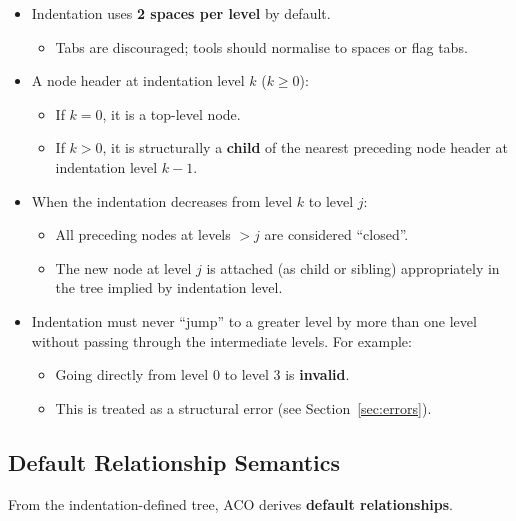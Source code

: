 \documentclass[11pt,twoside,a4paper]{article}
\begin{document}
\begin{itemize}[leftmargin=2em]
  \item Indentation uses \textbf{2 spaces per level} by default.
  \begin{itemize}[leftmargin=1.5em]
    \item Tabs are discouraged; tools should normalise to spaces or flag tabs.
  \end{itemize}

  \item A node header at indentation level \(k\) (\(k \geq 0\)):
  \begin{itemize}[leftmargin=1.5em]
    \item If \(k = 0\), it is a top-level node.
    \item If \(k > 0\), it is structurally a \textbf{child} of the nearest preceding node header at indentation level \(k - 1\).
  \end{itemize}

  \item When the indentation decreases from level \(k\) to level \(j\):
  \begin{itemize}[leftmargin=1.5em]
    \item All preceding nodes at levels \(> j\) are considered ``closed''.
    \item The new node at level \(j\) is attached (as child or sibling) appropriately in the tree implied by indentation level.
  \end{itemize}

  \item Indentation must never ``jump'' to a greater level by more than one level without passing through the intermediate levels. For example:
  \begin{itemize}[leftmargin=1.5em]
    \item Going directly from level 0 to level 3 is \textbf{invalid}.
    \item This is treated as a structural error (see Section~\ref{sec:errors}).
  \end{itemize}
\end{itemize}

\subsection{Default Relationship Semantics}

From the indentation-defined tree, ACO derives \textbf{default relationships}.
\end{document}
